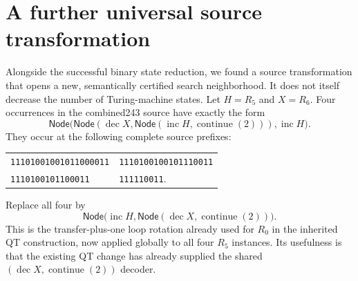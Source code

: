 \section{A further universal source transformation}
\label{sec:additional-h-rotation}

Alongside the successful binary state reduction, we found a source
transformation that opens a new, semantically certified search neighborhood.
It does not itself decrease the number of Turing-machine states.
Let $H=R_5$ and $X=R_6$.  Four occurrences in the combined243 source have
exactly the form
\[
 \mathsf{Node}\bigl(
   \mathsf{Node}(\operatorname{dec}X,
     \mathsf{Node}(\operatorname{inc}H,\operatorname{continue}(2))),
   \operatorname{inc}H\bigr).
\]
They occur at the following complete source prefixes:
\begin{center}
\begin{tabular}{ll}
\texttt{11101001001011000011}&\texttt{1110100100101110011}\\
\texttt{1110100101100011}&\texttt{111110011}.
\end{tabular}
\end{center}
Replace all four by
\[
 \mathsf{Node}\bigl(\operatorname{inc}H,
   \mathsf{Node}(\operatorname{dec}X,\operatorname{continue}(2))\bigr).
\]
This is the transfer-plus-one loop rotation already used for $R_0$ in the
inherited QT construction, now applied globally to all four $R_5$ instances.
Its usefulness is that the existing QT change has already supplied the
shared $(\operatorname{dec}X,\operatorname{continue}(2))$ decoder.

